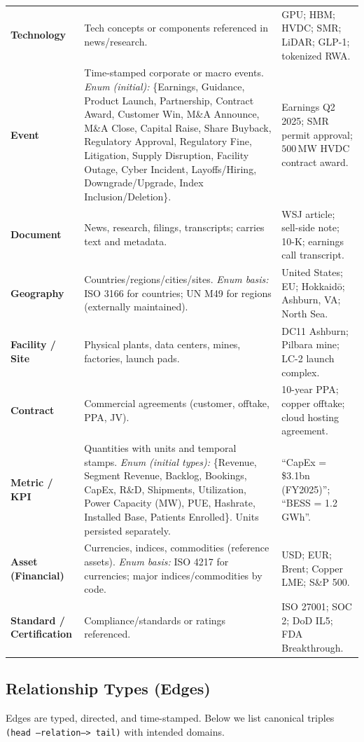 \documentclass[11pt]{article}
\begin{document}
\begin{longtable}{>{\bfseries}p{3.5cm} p{7.8cm} p{4.2cm}}
\addlinespace
Technology &
Tech concepts or components referenced in news/research. &
GPU; HBM; HVDC; SMR; LiDAR; GLP-1; tokenized RWA. \\
\addlinespace
Event &
Time-stamped corporate or macro events. \emph{Enum (initial):} \{Earnings, Guidance, Product Launch, Partnership, Contract Award, Customer Win, M\&A Announce, M\&A Close, Capital Raise, Share Buyback, Regulatory Approval, Regulatory Fine, Litigation, Supply Disruption, Facility Outage, Cyber Incident, Layoffs/Hiring, Downgrade/Upgrade, Index Inclusion/Deletion\}. &
Earnings Q2 2025; SMR permit approval; $500\,$MW HVDC contract award. \\
\addlinespace
Document &
News, research, filings, transcripts; carries text and metadata. &
WSJ article; sell-side note; 10-K; earnings call transcript. \\
\addlinespace
Geography &
Countries/regions/cities/sites. \emph{Enum basis:} ISO 3166 for countries; UN M49 for regions (externally maintained). &
United States; EU; Hokkaidō; Ashburn, VA; North Sea. \\
\addlinespace
Facility / Site &
Physical plants, data centers, mines, factories, launch pads. &
DC11 Ashburn; Pilbara mine; LC-2 launch complex. \\
\addlinespace
Contract &
Commercial agreements (customer, offtake, PPA, JV). &
10-year PPA; copper offtake; cloud hosting agreement. \\
\addlinespace
Metric / KPI &
Quantities with units and temporal stamps. \emph{Enum (initial types):} \{Revenue, Segment Revenue, Backlog, Bookings, CapEx, R\&D, Shipments, Utilization, Power Capacity (MW), PUE, Hashrate, Installed Base, Patients Enrolled\}. Units persisted separately. &
``CapEx = \$3.1bn (FY2025)''; ``BESS = 1.2\,GWh''. \\
\addlinespace
Asset (Financial) &
Currencies, indices, commodities (reference assets). \emph{Enum basis:} ISO 4217 for currencies; major indices/commodities by code. &
USD; EUR; Brent; Copper LME; S\&P 500. \\
\addlinespace
Standard / Certification &
Compliance/standards or ratings referenced. &
ISO 27001; SOC 2; DoD IL5; FDA Breakthrough. \\
\bottomrule
\end{longtable}

\subsection{Relationship Types (Edges)}
Edges are typed, directed, and time-stamped. Below we list canonical triples \texttt{(head --relation--> tail)} with intended domains.
\end{document}
